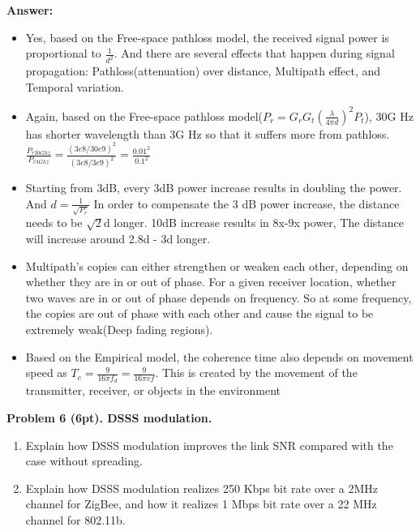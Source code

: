 \documentclass[12pt]{article}
\begin{document}
\textbf{Answer:} 
\begin{itemize}
    \item Yes, based on the Free-space pathloss model, the received signal power is proportional to $\frac{1}{d^2}$. And there are several effects that happen during signal propagation: Pathloss(attenuation) over distance, Multipath effect, and Temporal variation.
    \item Again, based on the Free-space pathloss model($P_{r} = G_{r}G_{t}(\frac{\lambda}{4\pi d})^2P_{t}$), 30G Hz has shorter wavelength than 3G Hz so that it suffers more from pathloss.
    $\frac{P_{r 30Ghz}}{P_{r3Ghz}} =\frac{(3e8/30e9)^2}{(3e8/3e9)^2} =\frac{0.01^2}{0.1^2}$
    \item Starting from 3dB, every 3dB power increase results in doubling the power. And $d = \frac{1}{\sqrt{P_r}}$ In order to compensate the 3 dB power increase, the distance needs to be $\sqrt{2}$d longer. 10dB increase results in 8x-9x power, The distance will increase around 2.8d - 3d longer.
    \item Multipath's copies can either strengthen or weaken each other, depending on whether they are in or out of phase. For a given receiver location, whether two waves are in or out of phase depends on frequency. So at some frequency, the copies are out of phase with each other and cause the signal to be extremely weak(Deep fading regions).
    \item Based on the Empirical model, the coherence time also depends on movement speed as $T_{c} = \frac{9}{16 \pi f_{d}} = \frac{9}{16 \pi vf}$. This is created by the movement of the transmitter, receiver, or objects in the environment\\
\end{itemize}




\noindent \textbf{Problem 6 (6pt). DSSS modulation.\\}
\begin{enumerate}
    \item Explain how DSSS modulation improves the link SNR compared with the case without
spreading.
    \item Explain how DSSS modulation realizes 250 Kbps bit rate over a 2MHz channel for
ZigBee, and how it realizes 1 Mbps bit rate over a 22 MHz channel for 802.11b.
\end{enumerate}
\end{document}
